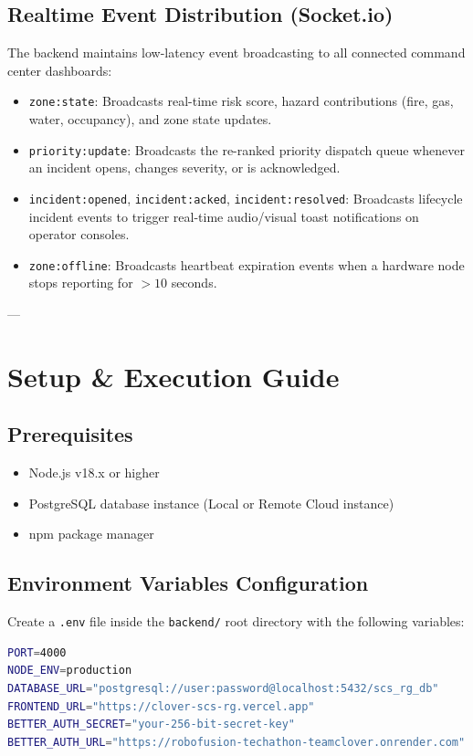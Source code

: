 \documentclass[11pt,a4paper]{article}
\begin{document}
\subsection{Realtime Event Distribution (Socket.io)}
The backend maintains low-latency event broadcasting to all connected command center dashboards:
\begin{itemize}[leftmargin=*]
    \item \texttt{zone:state}: Broadcasts real-time risk score, hazard contributions (fire, gas, water, occupancy), and zone state updates.
    \item \texttt{priority:update}: Broadcasts the re-ranked priority dispatch queue whenever an incident opens, changes severity, or is acknowledged.
    \item \texttt{incident:opened}, \texttt{incident:acked}, \texttt{incident:resolved}: Broadcasts lifecycle incident events to trigger real-time audio/visual toast notifications on operator consoles.
    \item \texttt{zone:offline}: Broadcasts heartbeat expiration events when a hardware node stops reporting for $>10$ seconds.
\end{itemize}

---

\section{Setup \& Execution Guide}

\subsection{Prerequisites}
\begin{itemize}
    \item Node.js v18.x or higher
    \item PostgreSQL database instance (Local or Remote Cloud instance)
    \item npm package manager
\end{itemize}

\subsection{Environment Variables Configuration}
Create a \texttt{.env} file inside the \texttt{backend/} root directory with the following variables:
\begin{lstlisting}[language=bash]
PORT=4000
NODE_ENV=production
DATABASE_URL="postgresql://user:password@localhost:5432/scs_rg_db"
FRONTEND_URL="https://clover-scs-rg.vercel.app"
BETTER_AUTH_SECRET="your-256-bit-secret-key"
BETTER_AUTH_URL="https://robofusion-techathon-teamclover.onrender.com"
\end{lstlisting}
\end{document}
